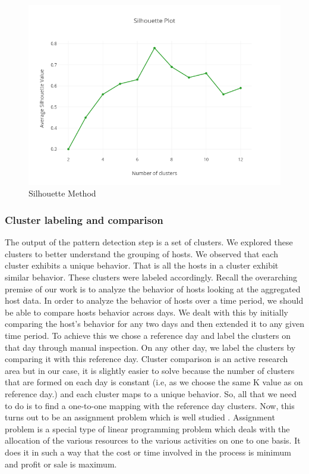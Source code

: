  \begin{figure}[t]
 	\centerline{\includegraphics[scale = 0.6]{silhouette.png}}
 	\caption{Silhouette Method}%
 \end{figure}
 
\subsubsection{Cluster labeling and comparison}  \label{cluster_labeling}

The output of the pattern detection step is a set of clusters. We explored these clusters to better understand the grouping of hosts. We observed that each cluster exhibits a unique behavior. That is all the hosts in a cluster exhibit similar behavior. These clusters were labeled accordingly.
Recall the overarching premise of our work is to analyze the behavior of hosts looking at the aggregated host data. In order to analyze the behavior of hosts over a time period, we should be able to compare hosts behavior across days. We dealt with this by initially comparing the host's behavior for any two days and then extended it to any given time period. To achieve this we chose a reference day and label the clusters on that day through manual inspection. On any other day, we label the clusters by comparing it with this reference day. Cluster comparison is an active research area but in our case, it is slightly easier to solve because the number of clusters that are formed on each day is constant (i.e, as we choose the same K value as on reference day.) and each cluster maps to a unique behavior. So, all that we need to do is to find a one-to-one mapping with the reference day clusters. 
Now, this turns out to be an assignment problem which is well studied \cite{kuhn1955hungarian}. Assignment problem is a special type of linear programming problem which deals with the allocation of the various resources to the various activities on one to one basis. It does it in such a way that the cost or time involved in the process is minimum and profit or sale is maximum. 

